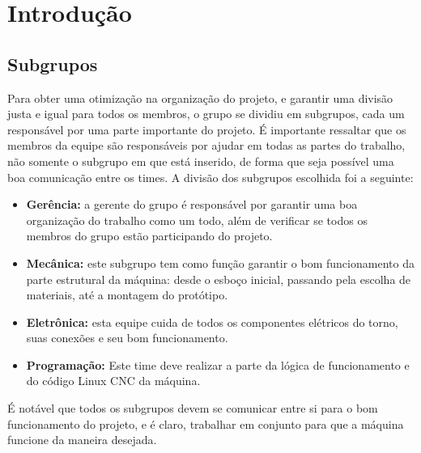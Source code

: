 \chapter{Introdução}

\setcounter{page}{1}


\section{Subgrupos}

Para obter uma otimização na organização do projeto, e garantir uma divisão justa e igual para todos os membros, o grupo se dividiu em subgrupos, cada um responsável por uma parte importante do projeto. É importante ressaltar que os membros da equipe são responsáveis por ajudar em todas as partes do trabalho, não somente o subgrupo em que está inserido, de forma que seja possível uma boa comunicação entre os times. A divisão dos subgrupos escolhida foi a seguinte:

\begin{itemize}
    \item \textbf{Gerência:} a gerente do grupo é responsável por garantir uma boa organização do trabalho como um todo, além de verificar se todos os membros do grupo estão participando do projeto.
    \item \textbf{Mecânica:} este subgrupo tem como função garantir o bom funcionamento da parte estrutural da máquina: desde o esboço inicial, passando pela escolha de materiais, até a montagem do protótipo.
    \item \textbf{Eletrônica:} esta equipe cuida de todos os componentes elétricos do torno, suas conexões e seu bom funcionamento.
    \item \textbf{Programação:} Este time deve realizar a parte da lógica de funcionamento e do código Linux CNC da máquina.
\end{itemize}

É notável que todos os subgrupos devem se comunicar entre si para o bom funcionamento do projeto, e é claro, trabalhar em conjunto para que a máquina funcione da maneira desejada.

